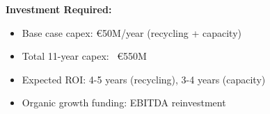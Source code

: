 \documentclass[aspectratio=169,12pt,xcolor=dvipsnames]{beamer}
\begin{document}
\begin{frame}
\begin{columns}[T]
  \end{columns}

  \vspace{0.8cm}

  \textbf{Investment Required:}

  \begin{itemize}
    \item Base case capex: €50M/year (recycling + capacity)
    \item Total 11-year capex: ~€550M
    \item Expected ROI: 4-5 years (recycling), 3-4 years (capacity)
    \item Organic growth funding: EBITDA reinvestment
  \end{itemize}

\end{frame}

\end{document}
